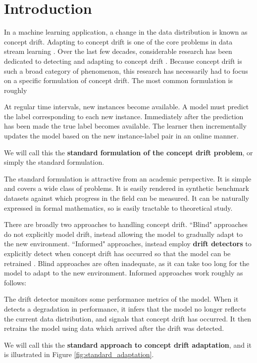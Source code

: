 \chapter{Introduction} \label{chapt:Introduction}

In a machine learning application, a change in the data distribution is known as concept drift. Adapting to concept drift is one of the core problems in data stream learning \cite{big_data}.
Over the last few decades, considerable research has been dedicated to detecting and adapting to concept drift \cite{gama_survey}\cite{barros_comparison}. Because concept drift is such a broad category of phenomenon, this research has necessarily had to focus on a specific formulation of concept drift. The most common formulation is roughly
\begin{displayquote}
  At regular time intervals, new instances become available. A model must predict the label corresponding to each new instance. Immediately after the prediction has been made the true label becomes available. The learner then incrementally updates the model based on the new instance-label pair in an online manner.
\end{displayquote}
We will call this the {\bf standard formulation of the concept drift problem}, or simply the standard formulation. %

The standard formulation is attractive from an academic perspective. It is simple and covers a wide class of problems. It is easily rendered in synthetic benchmark datasets against which progress in the field can be measured. It can be naturally expressed in formal mathematics, so is easily tractable to theoretical study.

There are broadly two approaches to handling concept drift. ``Blind" approaches do not explicitly model drift, instead allowing the model to gradually adapt to the new environment. ``Informed" approaches, instead employ {\bf drift detectors} to explicitly detect when concept drift has occurred so that the model can be retrained \cite{gama_survey}. Blind approaches are often inadequate, as it can take too long for the model to adapt to the new environment. Informed approaches work roughly as follows:
\begin{displayquote}
  The drift detector monitors some performance metrics of the model. When it detects a degradation in performance, it infers that the model no longer reflects the current data distribution, and signals that concept drift has occurred. It then retrains the model using data which arrived after the drift was detected.
\end{displayquote}
We will call this the {\bf standard approach to concept drift adaptation}, and it is illustrated in Figure \ref{fig:standard_adaptation}.

